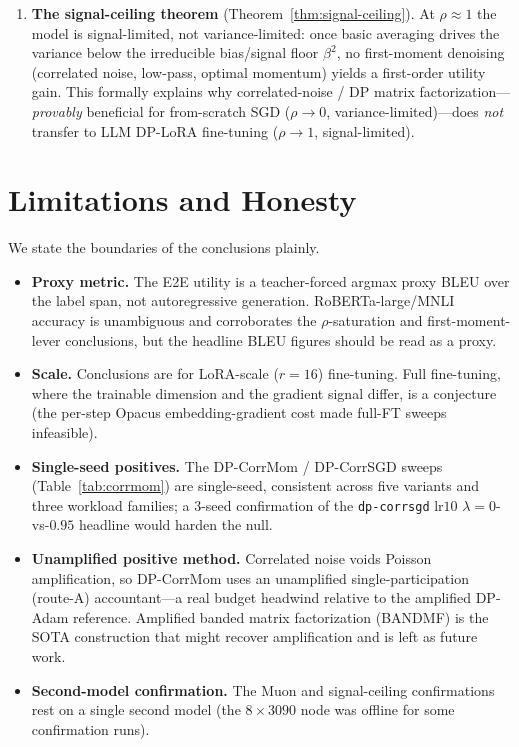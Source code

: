 \documentclass[11pt]{article}
\theoremstyle{plain}
\theoremstyle{definition}
\theoremstyle{remark}
\begin{document}
\begin{enumerate}[leftmargin=1.8em,itemsep=4pt,topsep=2pt]
\item \textbf{The signal-ceiling theorem} (Theorem~\ref{thm:signal-ceiling}). At $\rho\approx1$ the
model is signal-limited, not variance-limited: once basic averaging drives the variance below the
irreducible bias/signal floor $\beta^2$, no first-moment denoising (correlated noise, low-pass,
optimal momentum) yields a first-order utility gain. This formally explains why correlated-noise / DP
matrix factorization---\emph{provably} beneficial for from-scratch SGD ($\rho\to0$,
variance-limited)---does \emph{not} transfer to LLM DP-LoRA fine-tuning ($\rho\to1$,
signal-limited).
\end{enumerate}

\section{Limitations and Honesty}
\label{sec:limits}

We state the boundaries of the conclusions plainly.
\begin{itemize}[leftmargin=1.6em,itemsep=2pt,topsep=2pt]
\item \textbf{Proxy metric.} The E2E utility is a teacher-forced argmax proxy BLEU over the label
span, not autoregressive generation. RoBERTa-large/MNLI accuracy is unambiguous and corroborates the
$\rho$-saturation and first-moment-lever conclusions, but the headline BLEU figures should be read as
a proxy.
\item \textbf{Scale.} Conclusions are for LoRA-scale ($r{=}16$) fine-tuning. Full fine-tuning, where
the trainable dimension and the gradient signal differ, is a conjecture (the per-step Opacus
embedding-gradient cost made full-FT sweeps infeasible).
\item \textbf{Single-seed positives.} The DP-CorrMom / DP-CorrSGD sweeps (Table~\ref{tab:corrmom}) are
single-seed, consistent across five variants and three workload families; a $3$-seed confirmation of
the \texttt{dp-corrsgd} lr$10$ $\lambda{=}0$-vs-$0.95$ headline would harden the null.
\item \textbf{Unamplified positive method.} Correlated noise voids Poisson amplification, so DP-CorrMom
uses an unamplified single-participation (route-A) accountant---a real budget headwind relative to the
amplified DP-Adam reference. Amplified banded matrix factorization (BANDMF) is the SOTA construction
that might recover amplification and is left as future work.
\item \textbf{Second-model confirmation.} The Muon and signal-ceiling confirmations rest on a single
second model (the $8\times3090$ node was offline for some confirmation runs).
\end{itemize}
\end{document}
